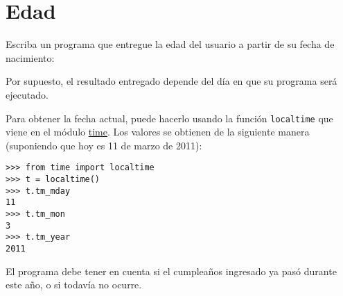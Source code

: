 \section{Edad}

Escriba un programa que entregue la edad del usuario a partir de su
fecha de nacimiento:

Por supuesto, el resultado entregado depende del día en que su programa
será ejecutado.

Para obtener la fecha actual, puede hacerlo usando la función
\lstinline!localtime! que viene en el módulo
\href{http://docs.python.org/library/time.html}{time}. Los valores se
obtienen de la siguiente manera (suponiendo que hoy es 11 de marzo de
2011):

\begin{lstlisting}
>>> from time import localtime
>>> t = localtime()
>>> t.tm_mday
11
>>> t.tm_mon
3
>>> t.tm_year
2011
\end{lstlisting}

El programa debe tener en cuenta si el cumpleaños ingresado ya pasó
durante este año, o si todavía no ocurre.
